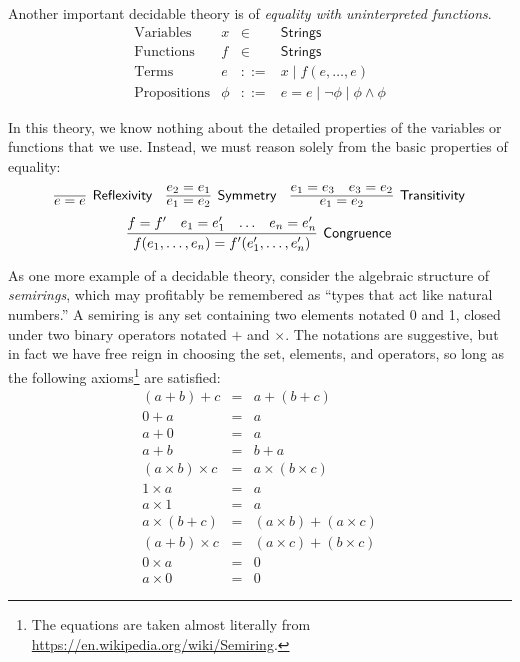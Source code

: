 \documentclass{amsbook}
\theoremstyle{definition}
\theoremstyle{remark}
\numberwithin{section}{chapter}
\numberwithin{equation}{chapter}
\begin{document}
\medskip

Another important decidable theory is of \emph{equality with uninterpreted functions}.
$$\begin{array}{rrcl}
  \textrm{Variables} & x &\in& \mathsf{Strings} \\
  \textrm{Functions} & f &\in& \mathsf{Strings} \\
  \textrm{Terms} & e &::=& x \mid f(e, \ldots, e) \\
  \textrm{Propositions} & \phi &::=& e = e \mid \neg \phi \mid \phi \land \phi
\end{array}$$

In this theory, we know nothing about the detailed properties of the variables or functions that we use.
Instead, we must reason solely from the basic properties of equality:
$$\infer[\mathsf{Reflexivity}]{e = e}{}
\quad \infer[\mathsf{Symmetry}]{e_1 = e_2}{
  e_2 = e_1
}
\quad \infer[\mathsf{Transitivity}]{e_1 = e_2}{
  e_1 = e_3
  & e_3 = e_2
}$$
$$\infer[\mathsf{Congruence}]{f(e_1, \ldots, e_n) = f'(e'_1, \ldots, e'_n)}{
  f = f'
  & e_1 = e'_1
  & \ldots
  & e_n = e'_n
}$$

\medskip

As one more example of a decidable theory, consider the algebraic structure of \emph{semirings}, which may profitably be remembered as ``types that act like natural numbers.''
A semiring is any set containing two elements notated 0 and 1, closed under two binary operators notated $+$ and $\times$.
The notations are suggestive, but in fact we have free reign in choosing the set, elements, and operators, so long as the following axioms\footnote{The equations are taken almost literally from \url{https://en.wikipedia.org/wiki/Semiring}.} are satisfied:
\begin{eqnarray*}
  (a + b) + c &=& a + (b + c) \\
  0 + a &=& a \\
  a + 0 &=& a \\
  a + b &=& b + a \\
  (a \times b) \times c &=& a \times (b \times c) \\
  1 \times a &=& a \\
  a \times 1 &=& a \\
  a \times (b + c) &=& (a \times b) + (a \times c) \\
  (a + b) \times c &=& (a \times c) + (b \times c) \\
  0 \times a &=& 0 \\
  a \times 0 &=& 0
\end{eqnarray*}
\end{document}
